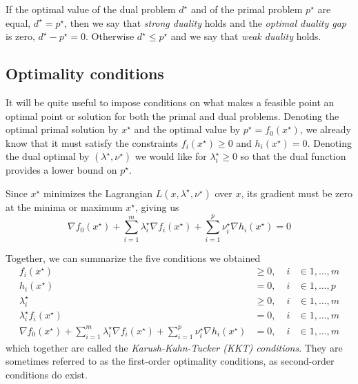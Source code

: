 If the optimal value of the dual problem $d^\star$ and of the primal problem $p^\star$ are equal, $d^\star = p^\star$, then we say that \emph{strong duality} holds and the \emph{optimal duality gap} is zero, $d^\star - p^\star = 0$. Otherwise $d^\star \le p^\star$ and we say that \emph{weak duality} holds.

\subsection{Optimality conditions} \label{ssec:KKT}
It will be quite useful to impose conditions on what makes a feasible point an optimal point or solution for both the primal and dual problems. Denoting the optimal primal solution by $x^\star$ and the optimal value by $p^\star = f_0(x^\star)$, we already know that it must satisfy the constraints $f_i(x^\star) \ge 0$ and $h_i(x^\star) = 0$. Denoting the dual optimal by $(\lambda^\star, \nu^\star)$ we would like for $\lambda_i^\star \ge 0$ so that the dual function provides a lower bound on $p^\star$. 


Since $x^\star$ minimizes the Lagrangian $L(x, \lambda^\star, \nu^\star)$ over $x$, its gradient must be zero at the minima or maximum $x^\star$, giving us
\[
\nabla f_0(x^\star) + \sum_{i=1}^m \lambda_i^\star \nabla f_i(x^\star)
+ \sum_{i=1}^p \nu_i^\star \nabla h_i(x^\star) = 0
\]

Together, we can summarize the five conditions we obtained
\begin{align} \label{eq:kkt}
f_i(x^\star) & \geq 0, \; & i & \in {1,\dots,m} \nonumber \\
h_i(x^\star) & = 0, \; & i & \in {1,\dots,p} \nonumber \\
\lambda_i^\star & \geq 0, \; & i & \in {1,\dots,m} \\
\lambda_i^\star f_i(x^\star) & = 0, \; & i & \in {1,\dots,m} \nonumber \\
\nabla f_0(x^\star) + \sum_{i=1}^m \lambda_i^\star \nabla f_i(x^\star)
+ \sum_{i=1}^p \nu_i^\star \nabla h_i(x^\star) & = 0, \; & i & \in {1,\dots,m} \nonumber
\end{align}
which together are called the \emph{Karush-Kuhn-Tucker (KKT) conditions}. They are sometimes referred to as the first-order optimality conditions, as second-order conditions do exist.

